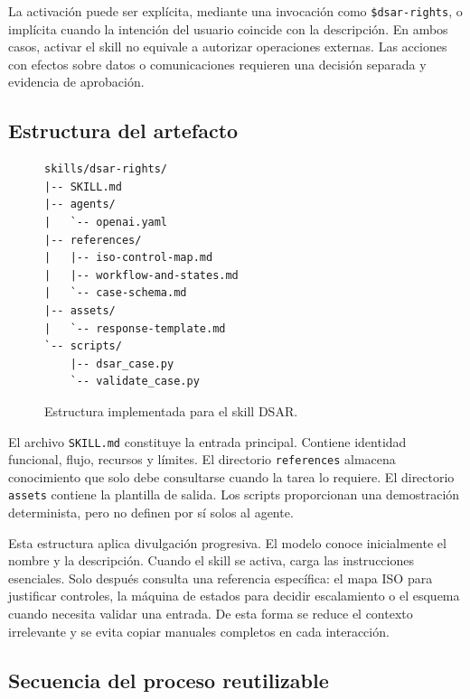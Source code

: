 \documentclass[11pt,a4paper]{article}
\begin{document}
La activación puede ser explícita, mediante una invocación como \texttt{\$dsar-rights}, o implícita cuando la intención del usuario coincide con la descripción. En ambos casos, activar el skill no equivale a autorizar operaciones externas. Las acciones con efectos sobre datos o comunicaciones requieren una decisión separada y evidencia de aprobación.

\subsection{Estructura del artefacto}

\begin{figure}[H]
\centering
\begin{minipage}{0.78\textwidth}
\begin{lstlisting}
skills/dsar-rights/
|-- SKILL.md
|-- agents/
|   `-- openai.yaml
|-- references/
|   |-- iso-control-map.md
|   |-- workflow-and-states.md
|   `-- case-schema.md
|-- assets/
|   `-- response-template.md
`-- scripts/
    |-- dsar_case.py
    `-- validate_case.py
\end{lstlisting}
\end{minipage}
\caption{Estructura implementada para el skill DSAR.}
\label{fig:skill-tree}
\end{figure}

El archivo \texttt{SKILL.md} constituye la entrada principal. Contiene identidad funcional, flujo, recursos y límites. El directorio \texttt{references} almacena conocimiento que solo debe consultarse cuando la tarea lo requiere. El directorio \texttt{assets} contiene la plantilla de salida. Los scripts proporcionan una demostración determinista, pero no definen por sí solos al agente.

Esta estructura aplica divulgación progresiva. El modelo conoce inicialmente el nombre y la descripción. Cuando el skill se activa, carga las instrucciones esenciales. Solo después consulta una referencia específica: el mapa ISO para justificar controles, la máquina de estados para decidir escalamiento o el esquema cuando necesita validar una entrada. De esta forma se reduce el contexto irrelevante y se evita copiar manuales completos en cada interacción.

\subsection{Secuencia del proceso reutilizable}
\end{document}
